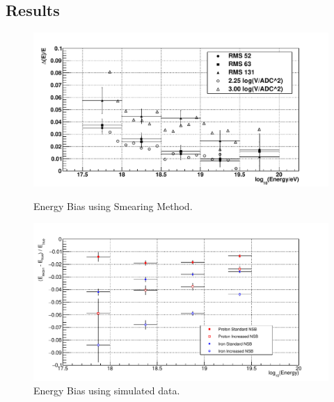 \subsection{Results}
\begin{figure}
\centering
\includegraphics[width=\textwidth]{chapters/graphs/SelectionEff/Smearing_RealData_EnergyBias.pdf}
\caption{Energy Bias using Smearing Method.}
\vspace{3mm}
\includegraphics[width=\textwidth]{chapters/graphs/SelectionEff/Simulation_ProtonIron_EnergyBias.pdf}
\caption{Energy Bias using simulated data.}
\end{figure}

